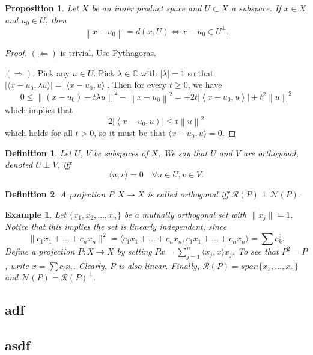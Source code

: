 \documentclass[letterpaper,twoside,11pt]{article}
\theoremstyle{mystyle}
\newtheorem{definition}{Definition}[section]
\newtheorem*{propp}{Proposition}
\newtheorem*{ex}{Example}
\newcommand{\C}{{\mathbb C}}
\begin{document}
\begin{propp}
  Let $X$ be an inner product space and $U\subset X$ a subspace. 
  If $x\in X$ and $u_0 \in U$, then 
  \[\left\| {x - {u_0}} \right\| = d\left( {x,U} \right) \Leftrightarrow x - {u_0} \in {U^ \bot }.\]

\end{propp}
\begin{proof}
  $(\Leftarrow)$ is trivial. Use Pythagoras.

  $(\Rightarrow)$. Pick any $u \in U$. Pick $\lambda \in \C$ with $|\lambda | =1$ so that $|\langle x-u_0, \lambda u\rangle| = |\langle x-u_0, u\rangle |$. Then for every $t\geq 0$, we have 
  \[0 \leqslant {\left\| {\left( {x - {u_0}} \right) - t\lambda u} \right\|^2} - {\left\| {x - {u_0}} \right\|^2} =  - 2t\left| {\left\langle {x - {u_0},u} \right\rangle } \right| + {t^2}{\left\| u \right\|^2}\]
  which implies that \[2\left| {\left\langle {x - {u_0},u} \right\rangle } \right| \leq t{\left\| u \right\|^2}\] which holds for all $t>0$, so it must be that $\langle x-u_0, u\rangle =0$. 
\end{proof}
\begin{definition}
  Let $U$, $V$ be subspaces of $X$. We say that $U$ and $V$ are orthogonal, denoted $U\perp V$, iff 
  \[\langle u, v\rangle = 0\quad \forall u \in U, v\in V.\]
\end{definition}
\begin{definition}
  A projection $P:X\to X$ is called orthogonal iff $\mathcal R(P) \perp \mathcal N(P)$. 
\end{definition}
\begin{ex}
  Let $\{x_1, x_2, \dots, x_n\}$ be a mutually orthogonal set with $\|x_j\|=1$. Notice that this implies the set is linearly independent, since \[\|c_1x_1 + \dots + c_n x_n\|^2 = \langle c_1x_1 + \dots + c_nx_n,c_1x_1 + \dots + c_nx_n \rangle = \sum c_k^2.\]
  Define a projection $P: X\to X$ by setting $Px = \sum\limits_{j=1}^n \langle x_j, x\rangle x_j$. To see that $P^2=P$, write $x = \sum c_ix_i$. Clearly, $P$ is also linear. Finally, $\mathcal R(P) = span\{x_1,\dots,x_n\}$ and $\mathcal N(P) = \mathcal R(P)^\perp$. 
\end{ex}


\subsection*{adf}
\subsection*{asdf}
\end{document}
